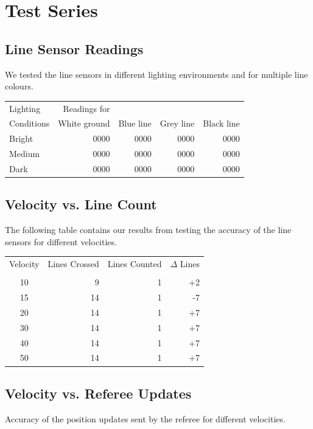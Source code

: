 \documentclass[12pt]{article}
\begin{document}
\lstset{language=C++}

\section*{Test Series}
\subsection*{Line Sensor Readings}
We tested the line sensors in different lighting environments and for multiple line colours.


\begin{tabular}{ | l | r | r | r | r | }
\hline
Lighting & Readings for & & & \\
Conditions & White ground & Blue line & Grey line & Black line \\ \hline
Bright & 0000 & 0000 & 0000 & 0000 \\ \hline
Medium & 0000 & 0000 & 0000 & 0000 \\ \hline
Dark & 0000 & 0000 & 0000 & 0000 \\
\hline
\end{tabular}

\subsection*{Velocity vs. Line Count}
The following table contains our results from testing the accuracy of the line sensors for different velocities.


\begin{tabular}{ | c || r | r | r | }
\hline
Velocity & Lines Crossed & Lines Counted & $\Delta$ Lines \\
 & & &  \\ \hline
10 & 9 & 1 & +2  \\ \hline
15 & 14 & 1 & -7  \\ \hline
20 & 14 & 1 & +7  \\ \hline
30  & 14 & 1 & +7  \\ \hline
40 & 14 & 1 & +7  \\ \hline
50 & 14 & 1 & +7  \\ \hline
\end{tabular}

\subsection*{Velocity vs. Referee Updates}
Accuracy of the position updates sent by the referee for different velocities.
\end{document}
